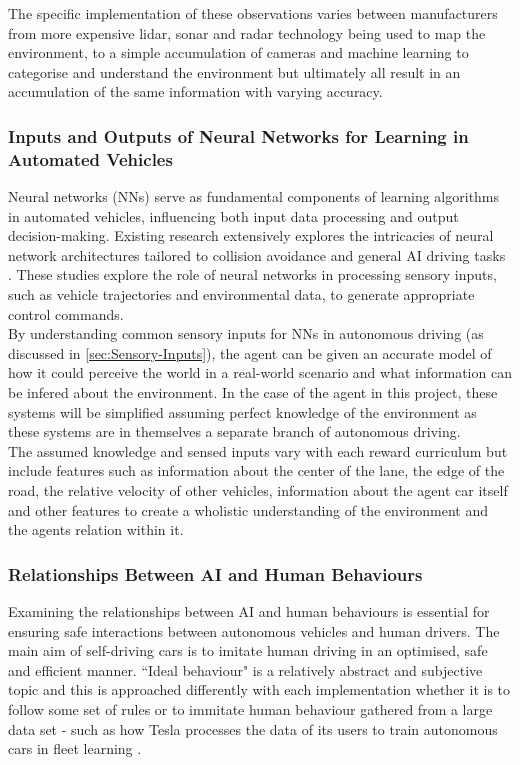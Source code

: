 \documentclass{article}
\begin{document}
The specific implementation of these observations varies between manufacturers from more expensive lidar, sonar and radar technology \cite{General-overview-of-ai-driving} being used to map the environment, to a simple accumulation of cameras and machine learning \cite{camera_only} to categorise and understand the environment but ultimately all result in an accumulation of the same information with varying accuracy.

\subsubsection{Inputs and Outputs of Neural Networks for Learning in Automated Vehicles}
Neural networks (NNs) serve as fundamental components of learning algorithms in automated vehicles, influencing both input data processing and output decision-making. Existing research extensively explores the intricacies of neural network architectures tailored to collision avoidance and general AI driving tasks \cite{Deep-RL-for-AI-driving-general-overview}. These studies explore the role of neural networks in processing sensory inputs, such as vehicle trajectories and environmental data, to generate appropriate control commands.\\

By understanding common sensory inputs for NNs in autonomous driving (as discussed in \ref{sec:Sensory-Inputs}), the agent can be given an accurate model of how it could perceive the world in a real-world scenario and what information can be infered about the environment. In the case of the agent in this project, these systems will be simplified assuming perfect knowledge of the environment as these systems are in themselves a separate branch of autonomous driving. \\

The assumed knowledge and sensed inputs vary with each reward curriculum but include features such as information about the center of the lane, the edge of the road, the relative velocity of other vehicles, information about the agent car itself and other features to create a wholistic understanding of the environment and the agents relation within it.

\subsubsection{Relationships Between AI and Human Behaviours}
Examining the relationships between AI and human behaviours is essential for ensuring safe interactions between autonomous vehicles and human drivers. The main aim of self-driving cars is to imitate human driving in an optimised, safe and efficient manner. ``Ideal behaviour" is a relatively abstract and subjective topic and this is approached differently with each implementation whether it is to follow some set of rules or to immitate human behaviour gathered from a large data set - such as how Tesla processes the data of its users to train autonomous cars in fleet learning \cite{tesla_fleet}.\\
\end{document}
